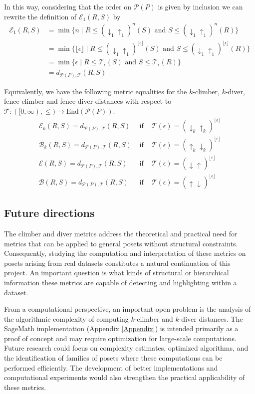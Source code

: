 \documentclass{article}[12pt]
\theoremstyle{exampstyle}
\theoremstyle{remark}
\newcommand{\B}{\mathcal{B}}
\newcommand{\E}{\mathcal{E}}
\renewcommand{\P}{\mathcal{P}}
\newcommand{\T}{\mathcal{T}}
\newcommand{\downup}[1][]{ \uparrow_{#1} \downarrow_{#1}}
\newcommand{\updown}[1][]{\downarrow_{#1} \uparrow_{#1}}
\newcommand{\End}{\text{End}}
\begin{document}
In this way,  considering that the order on $\P(P)$ is given by inclusion we can rewrite the definition of $\E_1(R,S)$ by
 \begin{align*}
    \E_1(R,S) &= \min \{ n \mid R\leq (\updown[1])^{n} (S) \text{ and } S \leq (\updown[1])^{n} (R) \} \\
    &= \min \{ \lfloor \epsilon \rfloor \mid R\leq (\updown[1])^{\lfloor \epsilon \rfloor} (S) \text{ and } S\leq (\updown[1])^{\lfloor \epsilon \rfloor} (R) \} \\ &= \min \{ \epsilon \mid R \leq \T_\epsilon (S) \text{ and } S \leq \T_\epsilon(R) \} \\
    &= d_{\P(P),\T}(R,S)
\end{align*}

Equivalently, we have the following metric equalities for the $k$-climber, $k$-diver, fence-climber and fence-diver distances with respect to $\T: ([0,\infty), \leq ) \to \End(\P(P))$.
\begin{equation*}
    \begin{array}{lll}
          \E_k(R,S) =  d_{\P(P),\T}(R,S) & \text{ if } & \T(\epsilon) = (\updown[k])^{\lfloor \epsilon \rfloor} \\
          \B_k(R,S) =  d_{\P(P),\T}(R,S) & \text{ if } & \T(\epsilon) = (\downup[k])^{\lfloor \epsilon \rfloor} \\
          \E(R,S) =  d_{\P(P),\T}(R,S) & \text{ if } & \T(\epsilon) = (\updown)^{\lfloor \epsilon \rfloor} \\
          \B(R,S) =  d_{\P(P),\T}(R,S) & \text{ if } & \T(\epsilon) = (\downup)^{\lfloor \epsilon \rfloor} 
    \end{array}
\end{equation*}

\subsection{Future directions}

The climber and diver metrics address the theoretical and practical need for metrics that can be applied to general posets without structural constraints. Consequently, studying the computation and interpretation of these metrics on posets arising from real datasets constitutes a natural continuation of this project. An important question is what kinds of structural or hierarchical information these metrics are capable of detecting and highlighting within a dataset. 

From a computational perspective, an important open problem is the analysis of the algorithmic complexity of computing $k$-climber and $k$-diver distances. The SageMath implementation (Appendix \ref{Appendix}) is intended primarily as a proof of concept and may require optimization for large-scale computations. Future research  could focus on complexity estimates, optimized algorithms, and the identification of families of posets where these computations can be performed efficiently. The development of better implementations and computational experiments would also strengthen the practical applicability of these metrics.
\end{document}
